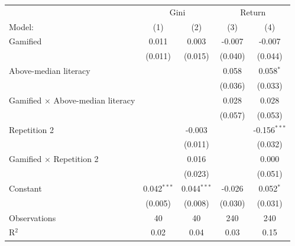 \begin{tabular}{lcccc}
   \tabularnewline \midrule \midrule
    & \multicolumn{2}{c}{Gini} & \multicolumn{2}{c}{Return} \\ 
   Model:                                   & (1)           & (2)           & (3)     & (4)\\  
   \midrule
   Gamified                                 & 0.011         & 0.003         & -0.007  & -0.007\\   
                                            & (0.011)       & (0.015)       & (0.040) & (0.044)\\   
   Above-median literacy                    &               &               & 0.058   & 0.058$^{*}$\\   
                                            &               &               & (0.036) & (0.033)\\   
   Gamified $\times$ Above-median literacy  &               &               & 0.028   & 0.028\\   
                                            &               &               & (0.057) & (0.053)\\   
   Repetition 2                             &               & -0.003        &         & -0.156$^{***}$\\   
                                            &               & (0.011)       &         & (0.032)\\   
   Gamified $\times$ Repetition 2           &               & 0.016         &         & 0.000\\   
                                            &               & (0.023)       &         & (0.051)\\   
   Constant                                 & 0.042$^{***}$ & 0.044$^{***}$ & -0.026  & 0.052$^{*}$\\   
                                            & (0.005)       & (0.008)       & (0.030) & (0.031)\\   
   \midrule
   Observations                             & 40            & 40            & 240     & 240\\  
   R$^2$                                    & 0.02          & 0.04          & 0.03    & 0.15\\  
   \midrule \midrule
\end{tabular}
